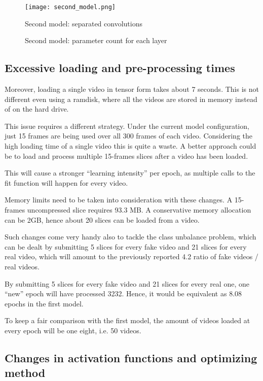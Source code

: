 \begin{figure}[h]
\caption{Second model: separated convolutions}
\centering
\texttt{[image: second\_model.png]}
\end{figure}

\begin{figure}[h]
\caption{Second model: parameter count for each layer}
\centering

\end{figure}

\subsection{Excessive loading and pre-processing times}

Moreover, loading a single video in tensor form takes about 7 seconds.
This is not different even using a ramdisk, where all the videos are stored in
memory instead of on the hard drive.

This issue requires a different strategy. Under the current model configuration,
just 15 frames are being used over all 300 frames of each video. Considering the
high loading time of a single video this is quite a waste.
A better approach could be to load and process multiple 15-frames slices after a video
has been loaded.

This will cause a stronger ``learning intensity'' per epoch, as multiple calls to
the fit function will happen for every video.

Memory limits need to be taken into consideration with these changes.
A 15-frames uncompressed slice requires 93.3 MB. A conservative memory allocation
can be 2GB, hence about 20 slices can be loaded from a video.

Such changes come very handy also to tackle the class unbalance problem, which can
be dealt by submitting 5 slices for every fake video and 21 slices for every real
video, which will amount to the previously reported 4.2 ratio of fake videos / real videos.

By submitting 5 slices for every fake video and 21 slices for every real one, one ``new'' 
epoch will have processed 3232. Hence, it would be equivalent as $8.08$ epochs in the 
first model.

To keep a fair comparison with the first model, the amount of videos loaded at every epoch
will be one eight, i.e. 50 videos.

\subsection{Changes in activation functions and optimizing method}

